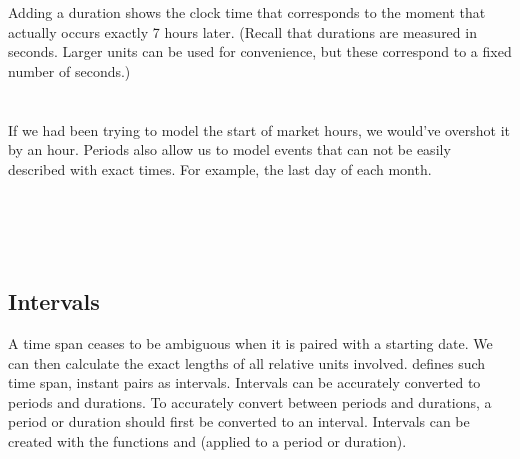 \documentclass[article]{jss}
\begin{document}
\\
\\

Adding a duration shows the clock time that corresponds to the moment that actually occurs exactly 7 hours later. (Recall that durations are measured in seconds. Larger units can be used for convenience, but these correspond to a fixed number of seconds.)\\

\\
\\

If we had been trying to model the start of market hours, we would've overshot it by an hour. Periods also allow us to model events that can not be easily described with exact times. For example, the last day of each month.\\

\\
\code{ [ [1] "2010-01-31 CST" "2010-02-28 CST" "2010-03-31 CDT" "2010-04-30 CDT"}\\
 \\
\\

\subsection{Intervals}
\label{sec:intervals}

A time span ceases to be ambiguous when it is paired with a starting date. We can then calculate the exact lengths of all relative units involved. defines such time span, instant pairs as intervals. Intervals can be accurately converted to periods and durations. To accurately convert between periods and durations, a period or duration should first be converted to an interval. Intervals can be created with the functions  and  (applied to a period or duration).\\

\\
\\
\end{document}
